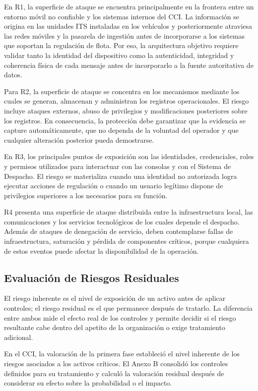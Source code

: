 En R1, la superficie de ataque se encuentra principalmente en la frontera entre un
entorno móvil no confiable y los sistemas internos del CCI. La información se origina en las
unidades ITS instaladas en los vehículos y posteriormente atraviesa las redes móviles y la
pasarela de ingestión antes de incorporarse a los sistemas que soportan la regulación de flota.
Por eso, la arquitectura objetivo requiere validar tanto la identidad del dispositivo como
la autenticidad, integridad y coherencia física de cada mensaje antes de incorporarlo a la fuente
autoritativa de datos.

Para R2, la superficie de ataque se concentra en los mecanismos mediante los cuales se generan, almacenan y administran los registros operacionales. El riesgo incluye ataques externos, abuso de privilegios y modificaciones posteriores sobre los registros. En consecuencia, la protección debe garantizar que la evidencia se capture automáticamente, que no dependa de la voluntad del operador y que cualquier alteración posterior pueda demostrarse.

En R3, los principales puntos de exposición son las identidades, credenciales, roles y permisos utilizados para interactuar con las consolas y con el Sistema de Despacho. El riesgo se materializa cuando una identidad no autorizada logra ejecutar acciones de regulación o cuando un usuario legítimo dispone de privilegios superiores a los necesarios para su función.

R4 presenta una superficie de ataque distribuida entre la infraestructura local, las comunicaciones y los servicios tecnológicos de los cuales depende el despacho. Además de ataques de denegación de servicio, deben contemplarse fallas de infraestructura, saturación y pérdida de componentes críticos, porque cualquiera de estos eventos puede afectar la disponibilidad de la operación.


\subsection{Evaluación de Riesgos Residuales}

El riesgo inherente es el nivel de exposición de un activo antes de aplicar controles; el riesgo residual es el que permanece después de tratarlo. La diferencia entre ambos mide el efecto real de los controles y permite decidir si el riesgo resultante cabe dentro del apetito de la organización o exige tratamiento adicional.

En el CCI, la valoración de la primera fase \parencite{fase1cci2026} estableció el nivel inherente de los
riesgos asociados a los activos críticos. El Anexo B consolidó los controles definidos para su tratamiento y calculó la valoración residual después de considerar su efecto sobre la probabilidad o el impacto.

